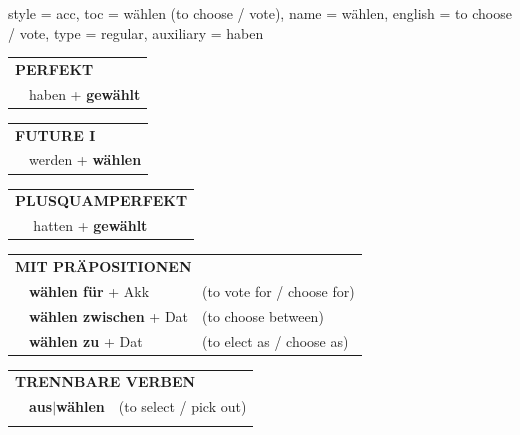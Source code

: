 \begin{verbentry}{
  style = {acc},
  toc = {wählen (to choose / vote)},
  name = {wählen},
  english = {to choose / vote},
  type = {regular},
  auxiliary = {haben}
}
 \begin{tabular}{rl}
     \multicolumn{2}{l}{\textbf{PERFEKT}}\\
   & haben + \textbf{gewählt}\\
  \end{tabular}
\hfill
\begin{tabular}{rl}
    \multicolumn{2}{l}{\textbf{FUTURE I}}\\
   & werden + \textbf{wählen}\\
  \end{tabular}
\hfill
\begin{tabular}{rl}
    \multicolumn{2}{l}{\textbf{PLUSQUAMPERFEKT}}\\
   & hatten + \textbf{gewählt}\\
  \end{tabular}

 \vspace{10pt}

\begin{tabular}{lll}
      \multicolumn{3}{l}{\textbf{MIT PRÄPOSITIONEN}}\\
& \textbf{wählen für} + Akk & (to vote for / choose for)\\
& \textbf{wählen zwischen} + Dat & (to choose between)\\
& \textbf{wählen zu} + Dat & (to elect as / choose as)\\
\end{tabular}
  \hfill
\begin{tabular}{lll}
      \multicolumn{3}{l}{\textbf{TRENNBARE VERBEN}}\\
 & \textbf{aus$|$wählen} & (to select / pick out)\\
\vspace{20pt}
  \end{tabular}
  
  \vspace{-5pt}
\end{verbentry}

